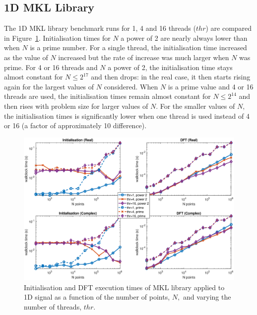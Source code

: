 \documentclass[a4paper]{article}
\begin{document}
\subsection{1D MKL Library}\label{Sec:1DMKL}

The 1D MKL library benchmark runs for 1, 4 and 16 threads ($thr$) are
compared in Figure~\ref{1DMKL}. Initialisation times for $N$ a power
of 2 are nearly always lower than when $N$ is a prime number. For a
single thread, the initialisation time increased as the value of $N$
increased but the rate of increase was much larger when $N$ was prime.
For 4 or 16 threads and $N$ a power of 2, the initialisation time
stays almost constant for $N\le 2^{17}$ and then drops: in the real
case, it then starts rising again for the largest values of $N$
considered. When $N$ is a prime value and 4 or 16 threads are used,
the initialisation times remain almost constant for $N\le 2^{14}$ and
then rises with problem size for larger values of $N.$ For the smaller
values of $N,$ the initialisation times is significantly lower when
one thread is used instead of 4 or 16 (a factor of approximately 10
difference).


\begin{figure}[!htb]
    \centering
    \includegraphics[width=0.9\linewidth]{../results/mkl_1d_thr.eps}
  \caption{Initialisation and DFT execution times of MKL library applied to 1D signal as a function of the
    number of points, $N,$ and varying the number of threads, $thr.$ }
  \label{1DMKL}
\end{figure}
\end{document}
